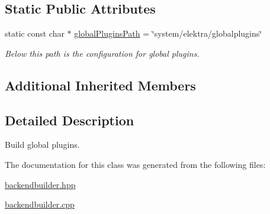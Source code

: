 \subsection*{Static Public Attributes}
\begin{DoxyCompactItemize}
\item 
\hypertarget{classkdb_1_1tools_1_1GlobalPluginsBuilder_ac4300427e2f9e072378f350c0e112156}{static const char $\ast$ \hyperlink{classkdb_1_1tools_1_1GlobalPluginsBuilder_ac4300427e2f9e072378f350c0e112156}{global\+Plugins\+Path} = \char`\"{}system/elektra/globalplugins\char`\"{}}\label{classkdb_1_1tools_1_1GlobalPluginsBuilder_ac4300427e2f9e072378f350c0e112156}

\begin{DoxyCompactList}\small\item\em Below this path is the configuration for global plugins. \end{DoxyCompactList}\end{DoxyCompactItemize}
\subsection*{Additional Inherited Members}


\subsection{Detailed Description}
Build global plugins. 

The documentation for this class was generated from the following files\+:\begin{DoxyCompactItemize}
\item 
\hyperlink{backendbuilder_8hpp}{backendbuilder.\+hpp}\item 
\hyperlink{backendbuilder_8cpp}{backendbuilder.\+cpp}\end{DoxyCompactItemize}

